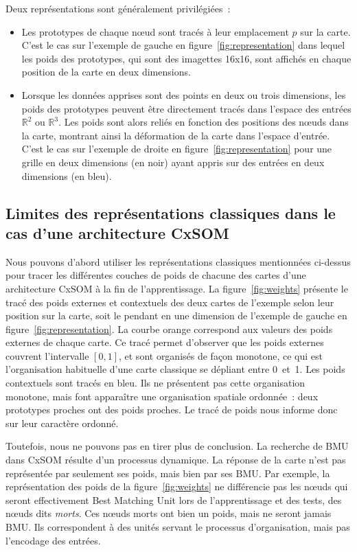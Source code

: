 \documentclass[../main]{subfiles}
\begin{document}
Deux représentations sont généralement privilégiées~:
\begin{itemize}
\item Les prototypes de chaque n\oe{}ud sont tracés à leur emplacement $p$ sur la carte. 
C'est le cas sur l'exemple de gauche en figure~\ref{fig:representation} dans lequel les poids des prototypes, qui sont des imagettes 16x16, sont affichés en chaque position de la carte en deux dimensions.
\item Lorsque les données apprises sont des points en deux ou trois dimensions, les poids des prototypes peuvent être directement tracés dans l'espace des entrées $\mathbb{R}^2$ ou $\mathbb{R}^3$. Les poids sont alors reliés en fonction des positions des n\oe{}uds dans la carte, montrant ainsi la déformation de la carte dans l'espace d'entrée. C'est le cas sur l'exemple de droite en figure~\ref{fig:representation} pour une grille en deux dimensions (en noir) ayant appris sur des entrées en deux dimensions (en bleu).
\end{itemize}



\subsection{Limites des représentations classiques dans le cas d'une architecture CxSOM}

Nous pouvons d'abord utiliser les représentations classiques mentionnées ci-dessus pour tracer les différentes couches de poids de chacune des cartes d'une architecture CxSOM à la fin de l'apprentissage.
La figure~\ref{fig:weights} présente le tracé des poids externes et contextuels des deux cartes de l'exemple selon leur position sur la carte, soit le pendant en une dimension de l'exemple de gauche en figure~\ref{fig:representation}.
La courbe orange correspond aux valeurs des poids externes de chaque carte.
Ce tracé permet d'observer que les poids externes couvrent l'intervalle $[0,1]$, et sont organisés de façon monotone, ce qui est l'organisation habituelle d'une carte classique se dépliant entre 0~et~1.
Les poids contextuels sont tracés en bleu. Ils ne présentent pas cette organisation monotone, mais font apparaître une organisation spatiale ordonnée~: deux prototypes proches ont des poids proches. 
Le tracé de poids nous informe donc sur leur caractère ordonné.

Toutefois, nous ne pouvons pas en tirer plus de conclusion.
La recherche de BMU dans CxSOM résulte d'un processus dynamique. La réponse de la carte n'est pas représentée par seulement ses poids, mais bien par ses BMU.
Par exemple, la représentation des poids de la figure~\ref{fig:weights} ne différencie pas les n\oe{}uds qui seront effectivement Best Matching Unit lors de l'apprentissage et des tests, des n\oe{}uds dits \emph{morts}.
Ces n\oe{}uds morts ont bien un poids, mais ne seront jamais BMU. Ils correspondent à des unités servant le processus d'organisation, mais pas l'encodage des entrées.
\end{document}
